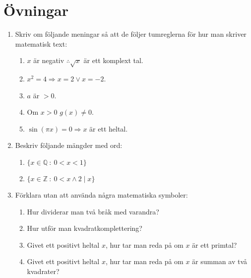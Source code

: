 \documentclass[titlepage]{article}
\begin{document}
\section{Övningar}
\begin{enumerate}
    \item Skriv om följande meningar så att de följer tumreglerna för hur man skriver matematisk text:
    \begin{enumerate}[label=(\alph*)]
        \item $x$ är negativ $\therefore \sqrt{x}$ är ett komplext tal.
        \item $x^2 = 4 \Rightarrow x=2 \vee x=-2$.
        \item $a$ är $>0$.
        \item Om $x>0$ $g(x) \neq 0$.
        \item $\sin(\pi x)= 0\Rightarrow x$ är ett heltal. 
    \end{enumerate}
    \item Beskriv följande mängder med ord:
    \begin{enumerate}
        \item $\{x \in \mathbb{Q} \: : \: 0<x<1\}$
        \item $\{x \in \mathbb{Z} \: : \: 0 < x \wedge 2 \mid x\}$
    \end{enumerate}
    \item Förklara utan att använda några matematiska symboler:
    \begin{enumerate}[label=(\alph*)]
        \item Hur dividerar man två bråk med varandra?
        \item Hur utför man kvadratkomplettering?
        \item Givet ett positivt heltal $x$, hur tar man reda på om $x$ är ett primtal?
        \item Givet ett positivt heltal $x$, hur tar man reda på om $x$ är summan av två kvadrater?
    \end{enumerate}
\end{enumerate}


\newpage

\end{document}

